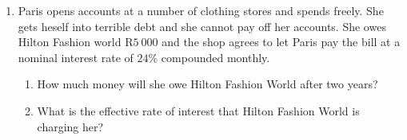 \begin{eocexercises}{}
\begin{enumerate}
\item{Paris opens accounts at a number of clothing stores and spends freely.  She gets heself into terrible debt and she cannot pay off her accounts.  She owes Hilton Fashion world R$5~000$ and the shop agrees to let Paris pay the bill at a nominal interest rate of $24\%$ compounded monthly.
\begin{enumerate}
\item{How much money will she owe Hilton Fashion World after two years?}
\item{What is the effective rate of interest that Hilton Fashion World is charging her?}
\end{enumerate}}
\end{enumerate}



\end{eocexercises}




